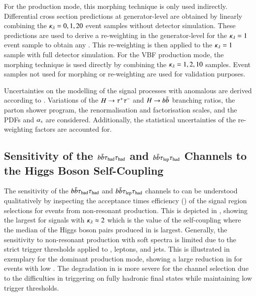For the \ggF production mode, this morphing technique is only used
indirectly. Differential cross section predictions at generator-level
are obtained by linearly combining the $\kappa_{\lambda} = 0, 1, 20$ event
samples without detector simulation. These predictions are used to
derive a re-weighting in the generator-level \mHH for the
$\kappa_{\lambda} = 1$ event sample to obtain any \klambda. This re-weighting
is then applied to the $\kappa_{\lambda} = 1$ sample with full detector
simulation. For the VBF production mode, the morphing technique is
used directly by combining the $\kappa_{\lambda} = 1, 2, 10$ samples. Event
samples not used for morphing or re-weighting are used for validation
purposes.

Uncertainties on the modelling of the signal processes with anomalous
\klambda are derived according to .
Variations of the $H \to \tau^{+} \tau^{-}$ and $H \to b\bar{b}$ branching ratios,
the parton shower program, the renormalisation and factorisation
scales, and the PDFs and $\alpha_{\text{s}}$ are considered. Additionally, the
statistical uncertainties of the \klambda re-weighting factors are
accounted for.


\subsection{Sensitivity of the $b\bar{b}\tau_{\text{had}}\tau_{\text{had}}$ and
  $b\bar{b}\tau_{\text{lep}}\tau_{\text{had}}$ Channels to the Higgs Boson Self-Coupling}%
\label{sec:self_coupling_bbtt_limitations}

The sensitivity of the $b\bar{b}\tau_{\text{had}}\tau_{\text{had}}$ and
$b\bar{b}\tau_{\text{lep}}\tau_{\text{had}}$ channels to \klambda can be understood
qualitatively by inspecting the acceptance times efficiency
(\AccTimesEff) of the signal region selections for events from
non-resonant \HH production. This is depicted in
, showing the largest \AccTimesEff for
signals with $\kappa_{\lambda} \approx 2$ which is the value of the
self-coupling where the median \mHH of the Higgs boson pairs produced
in \ggF is largest. Generally, the sensitivity to non-resonant \HH
production with soft \mHH spectra is limited due to the strict trigger
thresholds applied to \tauhadvis, leptons, and jets. This is
illustrated in  exemplary for the dominant
\ggF production mode, showing a large reduction in \AccTimesEff for
events with low \mHH. The degradation in \AccTimesEff is more severe
for the \hadhad channel selection due to the difficulties in
triggering on fully hadronic final states while maintaining low
trigger thresholds.


